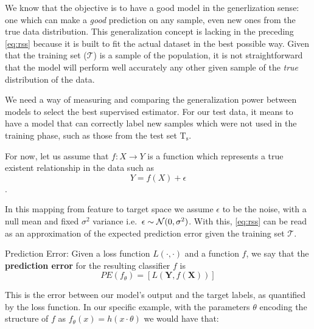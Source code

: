 
We know that the objective is to have a good model in the generlization sense: one which can make a \textit{good} prediction on any sample, even new ones from the true data distribution.
This generalization concept is lacking in the preceding \cref{eq:rss} because it is built to fit the actual dataset in the best possible way.
Given that the training set ($\mathcal{T}$) is a sample of the population, it is not straightforward that the model will perform well accurately any other given sample of the \textit{true} distribution of the data.

We need a way of measuring and comparing the generalization power between models to select the best supervised estimator.
For our test data, it means to have a model that can correctly label new samples which were not used in the training phase, such as those from the test set $\mathrm{T_s}$.


For now, let us assume that $f: X \rightarrow Y$ is a function which represents a true existent relationship in the data such as
$$Y = f(X) + \epsilon$$.

In this mapping from feature to target space we assume $\epsilon$ to be the noise, with a null mean and fixed $\sigma^2$ variance i.e.\ $\epsilon \sim \operatorname{\mathcal{N}}(0,\sigma^2)$.
With this, \cref{eq:rss} can be read as an approximation of the expected prediction error given the training set $\mathcal{T}$.


\begin{definition}{Prediction Error:}
	Given a loss function $L(\cdot,\cdot)$ and a function $f$, we say that the \textbf{prediction error} for the resulting classifier $f$ is
	\[
	PE(f_\theta)= \left[ L(\textbf{Y},f(\textbf{X}))\right]
	\]
\end{definition}

This is the error between our model's output and the target labels, as quantified by the loss function.
 In our specific example, with the parameters $\theta$ encoding the structure of $f$ as $f_\theta(x) = h(x \cdot \theta)$ we would have that:

